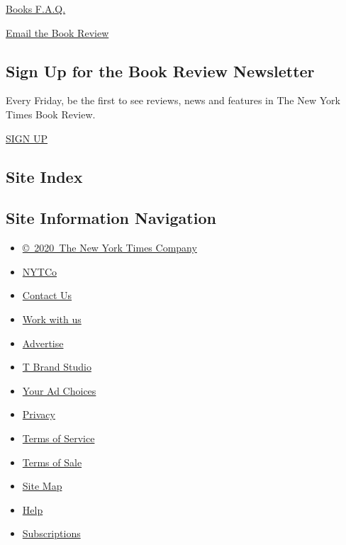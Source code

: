 \href{https://www.nytimes3xbfgragh.onion/membercenter/faq/books.html?ref=review}{Books
F.A.Q.}

\href{mailto:books@NYTimes.com}{Email the Book Review}

\hypertarget{sign-up-for-the-book-review-newsletter}{%
\subsection{Sign Up for the Book Review
Newsletter}\label{sign-up-for-the-book-review-newsletter}}

Every Friday, be the first to see reviews, news and features in The New
York Times Book Review.

\href{/newsletters/signup/BK}{SIGN UP}

\hypertarget{site-index}{%
\subsection{Site Index}\label{site-index}}

\hypertarget{site-information-navigation}{%
\subsection{Site Information
Navigation}\label{site-information-navigation}}

\begin{itemize}
\tightlist
\item
  \href{https://help.nytimes3xbfgragh.onion/hc/en-us/articles/115014792127-Copyright-notice}{©~2020~The
  New York Times Company}
\end{itemize}

\begin{itemize}
\tightlist
\item
  \href{https://www.nytco.com/}{NYTCo}
\item
  \href{https://help.nytimes3xbfgragh.onion/hc/en-us/articles/115015385887-Contact-Us}{Contact
  Us}
\item
  \href{https://www.nytco.com/careers/}{Work with us}
\item
  \href{https://nytmediakit.com/}{Advertise}
\item
  \href{http://www.tbrandstudio.com/}{T Brand Studio}
\item
  \href{https://www.nytimes3xbfgragh.onion/privacy/cookie-policy\#how-do-i-manage-trackers}{Your
  Ad Choices}
\item
  \href{https://www.nytimes3xbfgragh.onion/privacy}{Privacy}
\item
  \href{https://help.nytimes3xbfgragh.onion/hc/en-us/articles/115014893428-Terms-of-service}{Terms
  of Service}
\item
  \href{https://help.nytimes3xbfgragh.onion/hc/en-us/articles/115014893968-Terms-of-sale}{Terms
  of Sale}
\item
  \href{https://spiderbites.nytimes3xbfgragh.onion}{Site Map}
\item
  \href{https://help.nytimes3xbfgragh.onion/hc/en-us}{Help}
\item
  \href{https://www.nytimes3xbfgragh.onion/subscription?campaignId=37WXW}{Subscriptions}
\end{itemize}
